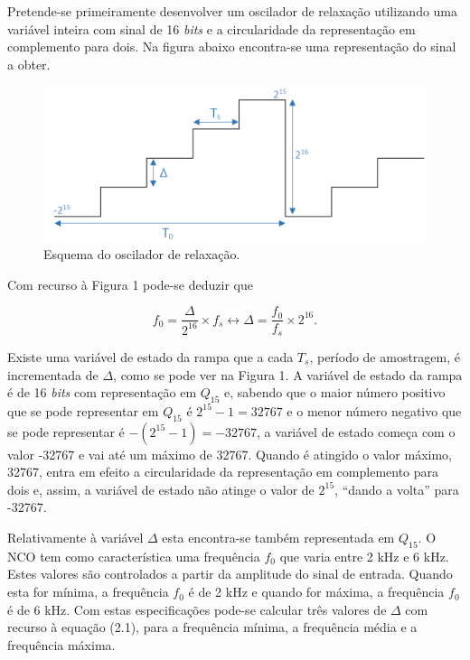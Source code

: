 \documentclass[11pt]{article}
\numberwithin{equation}{section}
\begin{document}
Pretende-se primeiramente desenvolver um oscilador de relaxação utilizando uma variável inteira com sinal de 16 \textit{bits} e a circularidade da representação em complemento para dois. Na figura abaixo encontra-se uma representação do sinal a obter.

\begin{figure}[H]
	\centering
	\includegraphics[keepaspectratio=true, scale=0.37]{teoricas/rampa}
	\caption{Esquema do oscilador de relaxação.}
	\vspace{-0.8em}
\end{figure}

Com recurso à Figura 1 pode-se deduzir que

\vspace{-3mm}
\begin{equation}
f_{0} = \frac{\Delta}{2^{16}} \times f_{s} \leftrightarrow \Delta = \frac{f_{0}}{f_{s}} \times 2^{16}.
\end{equation}

\vspace{1mm}
Existe uma variável de estado da rampa que a cada $T_{s}$, período de amostragem, é incrementada de $\Delta$, como se pode ver na Figura 1. A variável de estado da rampa é de 16 \textit{bits} com representação em $Q_{15}$ e, sabendo que o maior número positivo que se pode representar em $Q_{15}$ é $2^{15} - 1 = 32767$ e o menor número negativo que se pode representar é  $-(2^{15} - 1) = -32767$, a variável de estado começa com o valor -32767 e vai até um máximo de 32767. Quando é atingido o valor máximo, 32767, entra em efeito a circularidade da representação em complemento para dois e, assim, a variável de estado não atinge o valor de $2^{15}$, ``dando a volta'' para -32767. 

Relativamente à variável $\Delta$ esta encontra-se também representada em $Q_{15}$. O NCO tem como característica uma frequência $f_{0}$ que varia entre 2 kHz e 6 kHz. Estes valores são controlados a partir da amplitude do sinal de entrada. Quando esta for mínima, a frequência $f_{0}$ é de 2 kHz e quando for máxima, a frequência $f_{0}$ é de 6 kHz. Com estas especificações pode-se calcular três valores de $\Delta$ com recurso à equação (2.1), para a frequência mínima, a frequência média e a frequência máxima.
\end{document}
